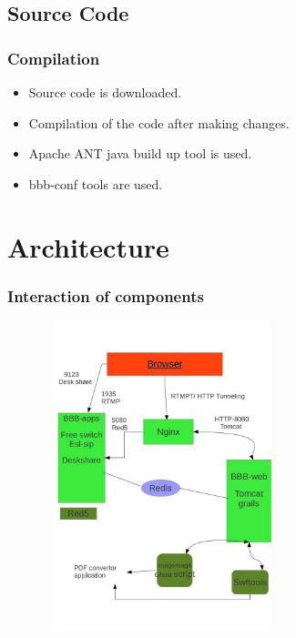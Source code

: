 \documentclass{beamer}
\begin{document}
\subsection{Source Code}
\begin{frame}
\frametitle{Compilation}
\begin{itemize}
\item Source code is downloaded.\pause
\item Compilation of the code after making changes.\pause
\item Apache ANT java build up tool is used.\pause
\item bbb-conf tools are used.
\end{itemize}
\end{frame}

\section{Architecture}

\begin{frame}
\frametitle{Interaction of components}
\includegraphics[width=90mm,height=90mm]{bbb.jpg}

\end{frame}
\end{document}
